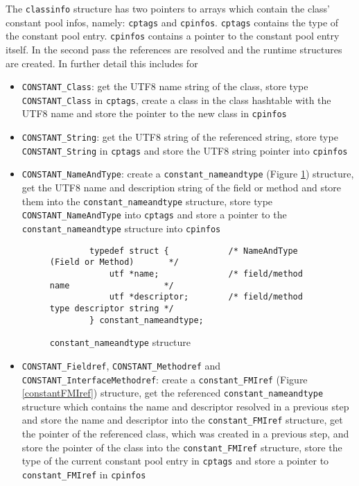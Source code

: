 The \texttt{classinfo} structure has two pointers to arrays which
contain the class' constant pool infos, namely: \texttt{cptags} and
\texttt{cpinfos}. \texttt{cptags} contains the type of the constant
pool entry. \texttt{cpinfos} contains a pointer to the constant pool
entry itself. In the second pass the references are resolved and the
runtime structures are created. In further detail this includes for

\begin{itemize}
 \item \texttt{CONSTANT\_Class}: get the UTF8 name string of the
 class, store type \texttt{CONSTANT\_Class} in \texttt{cptags}, create
 a class in the class hashtable with the UTF8 name and store the
 pointer to the new class in \texttt{cpinfos}

 \item \texttt{CONSTANT\_String}: get the UTF8 string of the
 referenced string, store type \texttt{CONSTANT\_String} in
 \texttt{cptags} and store the UTF8 string pointer into
 \texttt{cpinfos}

 \begingroup
 \item \texttt{CONSTANT\_NameAndType}: create a
 \texttt{constant\_nameandtype} (Figure \ref{constantnameandtype})
 structure, get the UTF8 name and description string of the field or
 method and store them into the \texttt{constant\_nameandtype}
 structure, store type \texttt{CONSTANT\_NameAndType} into
 \texttt{cptags} and store a pointer to the
 \texttt{constant\_nameandtype} structure into \texttt{cpinfos}

 \endgroup

\begin{figure}[h]
\begin{verbatim}
        typedef struct {            /* NameAndType (Field or Method)       */
            utf *name;              /* field/method name                   */
            utf *descriptor;        /* field/method type descriptor string */
        } constant_nameandtype;
\end{verbatim}
\caption{\texttt{constant\_nameandtype} structure}
\label{constantnameandtype}
\end{figure}

 \begingroup
 \item \texttt{CONSTANT\_Fieldref}, \texttt{CONSTANT\_Methodref} and
 \texttt{CONSTANT\_InterfaceMethodref}: create a
 \texttt{constant\_FMIref} (Figure \ref{constantFMIref}) structure,
 get the referenced \texttt{constant\_nameandtype} structure which
 contains the name and descriptor resolved in a previous step and
 store the name and descriptor into the \texttt{constant\_FMIref}
 structure, get the pointer of the referenced class, which was created
 in a previous step, and store the pointer of the class into the
 \texttt{constant\_FMIref} structure, store the type of the current
 constant pool entry in \texttt{cptags} and store a pointer to
 \texttt{constant\_FMIref} in \texttt{cpinfos}


\end{itemize}
